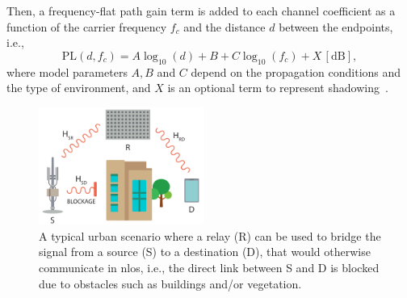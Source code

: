 Then, a frequency-flat path gain term is added to each channel coefficient as a function of the carrier frequency $f_c$ and the distance $d$ between the endpoints, i.e.,  %
\begin{equation}
\text{PL} (d, f_c) = A \log_{10} (d) + B + C \log_{10} (f_c) + X \, [\mathrm{dB}],
\label{eq:pl}
\end{equation}
where model parameters $A, B$ and $C$ depend on the propagation conditions and the type of environment, and $X$ is an optional term to represent shadowing~\cite{zugno2020implementation}. 

\begin{figure}[t]
  \centering
    \includegraphics[width=0.48\textwidth]{Figures/IrsSimulation/Scenario_high_level.pdf}
  \caption{A typical urban scenario where a relay (R) can be used to bridge the signal from a source (S) to a destination (D), that would otherwise communicate in \acrshort{nlos}, i.e., the direct link between S and D is blocked due to obstacles such as buildings and/or vegetation.}
  \label{Fig:scenario_high_lvl}
\end{figure}


